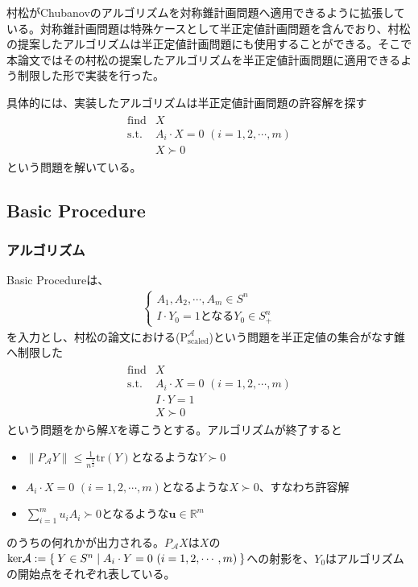 村松がChubanovのアルゴリズムを対称錐計画問題へ適用できるように拡張している\cite{SymmetricCone}。対称錐計画問題は特殊ケースとして半正定値計画問題を含んでおり、村松の提案したアルゴリズムは半正定値計画問題にも使用することができる。そこで本論文ではその村松の提案したアルゴリズムを半正定値計画問題に適用できるよう制限した形で実装を行った。

具体的には、実装したアルゴリズムは半正定値計画問題の許容解を探す
\begin{align*}
  \begin{array}{ll}
    \text{find} & X \\
    \text{s.t.} & A_i \cdot X = 0 \,\, (i = 1, 2, \cdots, m) \\
                & X \succ 0
  \end{array}
\end{align*}
という問題を解いている。

\subsection{Basic Procedure}
\subsubsection{アルゴリズム}
Basic Procedureは、
\begin{align*}
  \left\{
    \begin{array}{l}
      A_1, A_2, \cdots, A_m \in S^n \\
      I \cdot Y_0 = 1\text{となる}Y_0 \in S_+^n
    \end{array}
  \right.
\end{align*}
を入力とし、村松の論文における($\mathrm{P}_\mathrm{scaled}^\mathcal{A}$)という問題を半正定値の集合がなす錐へ制限した
\begin{align*}
  \begin{array}{ll}
    \text{find} & X \\
    \text{s.t.} & A_i \cdot X = 0 \,\, (i = 1, 2, \cdots, m) \\
                & I \cdot Y = 1 \\
                & X \succ 0
  \end{array}
\end{align*}
という問題をから解$X$を導こうとする。アルゴリズムが終了すると
\begin{itemize}
  \item $\displaystyle{\|P_\mathcal{A} Y\| \leq \frac{1}{n^{\frac{3}{2}}} \mathrm{tr}(Y)}$となるような$Y \succ 0$
  \item $A_i \cdot X = 0 \,\, (i = 1, 2, \cdots, m)$となるような$X \succ 0$、すなわち許容解
  \item $\displaystyle{\sum_{i = 1}^m u_i A_i \succ 0}$となるような$\mathbf{u} \in \mathbb{R}^m$
\end{itemize}
のうちの何れかが出力される。$P_\mathcal{A} X$は$X$の$\mathrm{ker}\mathcal{A} := \Set{Y \in S^n | A_i \cdot Y = 0 \,\, (i = 1, 2, \cdots, m)}$への射影を、$Y_0$はアルゴリズムの開始点をそれぞれ表している。

